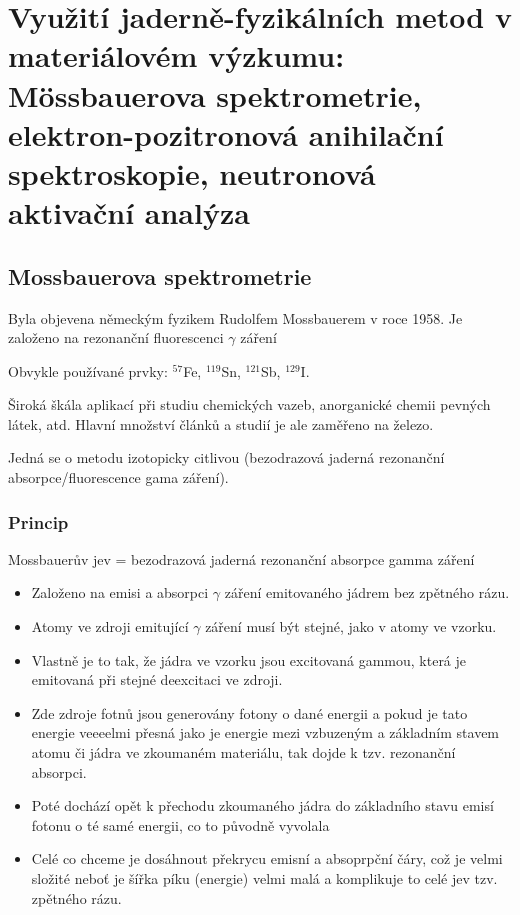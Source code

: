 \section[Využití jaderně-fyzikálních metod v materiálovém výzkumu]{Využití jaderně-fyzikálních metod v materiálovém výzkumu: Mössbauerova spektrometrie, elektron-pozitronová anihilační spektroskopie, neutronová aktivační analýza}

\subsection{Mossbauerova spektrometrie}

Byla objevena německým fyzikem Rudolfem Mossbauerem v roce 1958. Je založeno na rezonanční fluorescenci $\gamma$ záření

Obvykle používané prvky: $^{57}$Fe, $^{119}$Sn, $^{121}$Sb, $^{129}$I.

Široká škála aplikací při studiu chemických vazeb, anorganické chemii pevných látek, atd. Hlavní množství článků a studií je ale zaměřeno na železo.

Jedná se o metodu izotopicky citlivou (bezodrazová jaderná rezonanční absorpce/fluorescence gama záření).

\subsubsection{Princip}

Mossbauerův jev = bezodrazová jaderná rezonanční absorpce gamma záření

\begin{itemize}
    \item Založeno na emisi a absorpci $\gamma$ záření emitovaného jádrem bez zpětného rázu.
    \item Atomy ve zdroji emitující $\gamma$ záření musí být stejné, jako v atomy ve vzorku.
    \item Vlastně je to tak, že jádra ve vzorku jsou excitovaná gammou, která je emitovaná při stejné deexcitaci ve zdroji.
    \item Zde zdroje fotnů jsou generovány fotony o dané energii a pokud je tato energie veeeelmi přesná jako je energie mezi vzbuzeným a základním stavem atomu či jádra ve zkoumaném materiálu, tak dojde k tzv. rezonanční absorpci.
    \item Poté dochází opět k přechodu zkoumaného jádra do základního stavu emisí fotonu o té samé energii, co to původně vyvolala
    \item Celé co chceme je dosáhnout překrycu emisní a absoprpční čáry, což je velmi složité neboť je šířka píku (energie) velmi malá a komplikuje to celé jev tzv. zpětného rázu.
\end{itemize}

